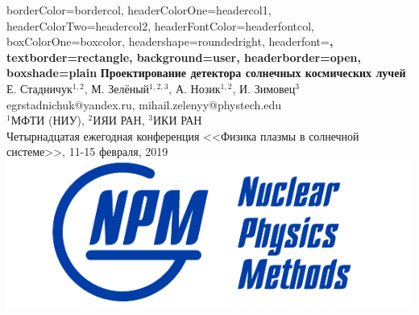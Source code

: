\documentclass[a1paper,portrait, fontscale=0.575]{baposter}
\begin{document}
    
    \background{ %
    }
    
    \begin{poster}{
            borderColor=bordercol, %
            headerColorOne=headercol1, %
            headerColorTwo=headercol2, %
            headerFontColor=headerfontcol, %
            boxColorOne=boxcolor, %
            headershape=roundedright, %
            headerfont=\Large\sf\bf, %
            textborder=rectangle,
            background=user,
            headerborder=open, %
            boxshade=plain
        }
        {}
        {\sf\bf Проектирование детектора солнечных космических лучей} %
        {\vspace{1em} Е. Стадничук$^{1,2}$, М. Зелёный$^{1,2,3}$, А. Нозик$^{1,2}$, И. Зимовец$^{3}$
            \\ %
            {\smaller egrstadnichuk@yandex.ru, mihail.zelenyy@phystech.edu }
            \\
            {\smaller $^1$МФТИ (НИУ), $^2$ИЯИ РАН, $^3$ИКИ РАН }
            \\
            {\smaller Четырнадцатая ежегодная конференция <<Физика плазмы в солнечной системе>>, 11-15 февраля, 2019}
        } %
        {\includegraphics[scale=1]{logoNpm.pdf}} %
        

\end{poster}
\end{document}
